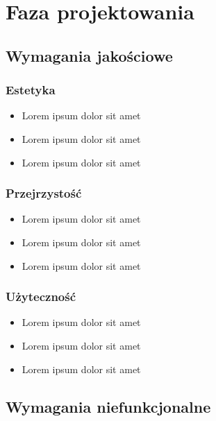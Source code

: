 \section{Faza projektowania}

\subsection{Wymagania jakościowe}

\subsubsection{Estetyka}

\begin{itemize}[leftmargin=*]
    \item Lorem ipsum dolor sit amet
    \item Lorem ipsum dolor sit amet
    \item Lorem ipsum dolor sit amet
\end{itemize}

\subsubsection{Przejrzystość}

\begin{itemize}[leftmargin=*]
    \item Lorem ipsum dolor sit amet
    \item Lorem ipsum dolor sit amet
    \item Lorem ipsum dolor sit amet
\end{itemize}

\subsubsection{Użyteczność}

\begin{itemize}[leftmargin=*]
    \item Lorem ipsum dolor sit amet
    \item Lorem ipsum dolor sit amet
    \item Lorem ipsum dolor sit amet
\end{itemize}

\newpage

\subsection{Wymagania niefunkcjonalne}

